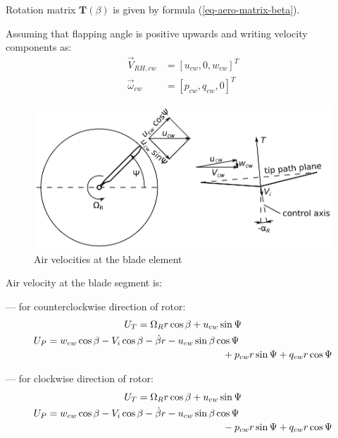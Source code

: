 Rotation matrix ${\boldsymbol T} \left( \beta \right)$ is given by formula (\ref{eq-aero-matrix-beta}).

Assuming that flapping angle is positive upwards and writing velocity components as:
\begin{align}
  {\vec V}_{RH,cw} &= \left[ u_{cw}, 0, w_{cw} \right]^T \\
  {\vec \omega}_{cw} &= \left[ p_{cw}, q_{cw}, 0 \right]^T
\end{align}

\begin{figure}
  \centering
  \includegraphics[width=120mm]{eps/blade_element_velocity.eps}
  \caption{Air velocities at the blade element}
\end{figure}

Air velocity at the blade segment is:

--- for counterclockwise direction of rotor:
\begin{gather}
  U_T = \Omega_R r \cos \beta + u_{cw} \sin \Psi \\
  \begin{multlined}[0.88\textwidth]
    U_P =
    w_{cw} \cos \beta - V_i \cos \beta
    - \dot \beta r - u_{cw} \sin \beta \cos \Psi \\
    + p_{cw} r \sin \Psi + q_{cw} r \cos \Psi
  \end{multlined}
\end{gather}

--- for clockwise direction of rotor:
\begin{gather}
  U_T = \Omega_R r \cos \beta + u_{cw} \sin \Psi \\
  \begin{multlined}[0.88\textwidth]
    U_P =
    w_{cw} \cos \beta - V_i \cos \beta
    - \dot \beta r - u_{cw} \sin \beta \cos \Psi \\
    - p_{cw} r \sin \Psi + q_{cw} r \cos \Psi
  \end{multlined}
\end{gather}

